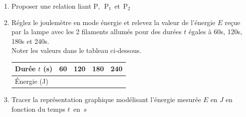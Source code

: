 \documentclass[11pt,a4paper]{article}
\newcommand{\cadreblanc}[1]{%
\medskip\framebox[\linewidth][c]{%
\rule{0mm}{#1mm}}\par
\medskip}
\begin{document}
\begin{enumerate}[label=3.\arabic*]
    \vspace{3mm}
    \begin{center}
        \vspace{-5mm} 
    \end{center}

    \item  Proposer une relation liant $\mathrm{P,~~ P_1 ~~et~~ P_2}$ \\ 

    \begin{center}
        \begin{minipage}{5cm}
        \cadreblanc{10}
        \end{minipage}
    \end{center}










    
   \item Réglez le joulemètre en mode énergie et relevez la valeur de l'énergie $E$ reçue par la lampe avec les 2 filaments allumés pour des durées $t$ égales à 60s, 120s, 180s et 240s. \\ Noter les valeurs dans le tableau ci-dessous. 


\begin{center}
    

    \begin{tabular}{|C{2cm}||C{2cm}|C{2cm}|C{2cm}|C{2cm}|}
         \hline
         Durée $t$ (s)& 60 & 120 & 180 & 240\\
         \hline
         Énergie (J)&  &  &  & \\
         \hline
    \end{tabular}
\end{center}

\newpage

     \item  Tracer la représentation graphique modélisant l'énergie mesurée $E$ en $J$ en fonction du temps $t$~en~$s$ \\[1.5 cm]

\begin{center}
    




\end{center}
\end{enumerate}
\end{document}
